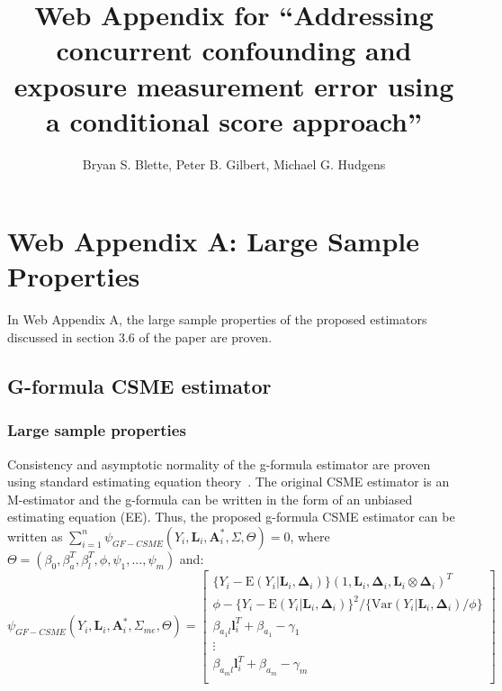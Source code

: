 \documentclass[12pt]{article}
\title{Web Appendix for ``Addressing concurrent confounding and exposure measurement error using a conditional score approach''}
\author{Bryan S. Blette, Peter B. Gilbert, Michael G. Hudgens}
\date{}
\begin{document}


\maketitle

\section{Web Appendix A: Large Sample Properties}

In Web Appendix A, the large sample properties of the proposed estimators discussed in section 3.6 of the paper are proven.

\subsection{G-formula CSME estimator}

\subsubsection{Large sample properties}

Consistency and asymptotic normality of the g-formula estimator are proven using standard estimating equation theory~\citep{stefanski2002}. The original CSME estimator is an M-estimator and the g-formula can be written in the form of an unbiased estimating equation (EE). Thus, the proposed g-formula CSME estimator can be written as $\sum_{i=1}^{n} \psi_{GF-CSME}(Y_{i}, \bm{L}_{i}, \bm{A}^{*}_{i}, \Sigma, \Theta) = 0$, where $\Theta = (\beta_{0}, \beta^{T}_{a}, \beta^{T}_{l}, \phi, \psi_{1}, ..., \psi_{m})$ and:
\begin{equation*}
    \psi_{GF-CSME}(Y_{i}, \bm{L}_{i}, \bm{A}^{*}_{i}, \Sigma_{me}, \Theta) =
    \begin{bmatrix}
       \{ Y_{i} - \text{E}(Y_{i} | \bm{L}_{i}, \bm{\Delta}_{i}) \} (1, \bm{L}_{i}, \bm{\Delta}_{i}, \bm{L}_{i} \otimes \bm{\Delta}_{i})^{T} \\
        \phi - \{ Y_{i} - \text{E}(Y_{i} | \bm{L}_{i}, \bm{\Delta}_{i}) \}^{2} / \{ \text{Var}(Y_{i} | \bm{L}_{i}, \bm{\Delta}_{i}) / \phi \} \\
        \beta_{a_{1}l}\bm{l}_{i}^{T} + \beta_{a_{1}} - \gamma_{1} \\
        \vdots \\
        \beta_{a_{m}l}\bm{l}_{i}^{T} + \beta_{a_{m}} - \gamma_{m} \\
    \end{bmatrix}
\end{equation*}
\end{document}
